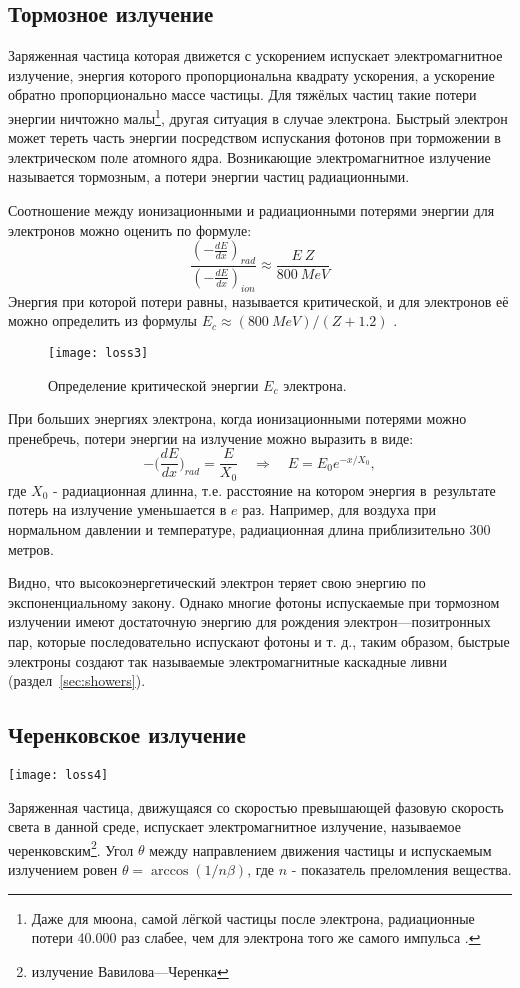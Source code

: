 \subsection{Тормозное излучение}
\label{sec:breaking}
Заряженная частица которая движется с ускорением испускает
электромагнитное излучение, энергия которого пропорциональна квадрату
ускорения, а ускорение обратно пропорционально массе частицы. Для
тяжёлых частиц такие потери энергии ничтожно малы\footnote{Даже для
мюона, самой лёгкой частицы после электрона, радиационные потери 40.000
раз слабее, чем для электрона того же самого импульса \cite{kor:06}.},
другая ситуация в случае электрона. Быстрый электрон может тереть часть
энергии посредством испускания фотонов при торможении в электрическом
поле атомного ядра. Возникающие электромагнитное излучение называется
тормозным, а потери энергии частиц радиационными.

Соотношение между ионизационными и радиационными потерями энергии для
электронов можно оценить по формуле:
\[
\frac{(-\frac{dE}{dx})_{rad}}{(-\frac{dE}{dx})_{ion}} \approx \frac{E~Z}{800~MeV}
\]
Энергия при которой потери равны, называется критической, и для электронов
её можно определить из формулы $E_c \approx (800~MeV)/(Z+1.2)$ \cite{sta}.
\begin{figure}[h]\center
  \texttt{[image: loss3]}
  \caption{Определение критической энергии $E_c$ электрона.}
  \label{fig:loss3}
\end{figure}

При больших энергиях электрона, когда ионизационными потерями можно
пренебречь, потери энергии на излучение можно выразить в виде:
\[
-\Bigg(\frac{dE}{dx}\Bigg)_{rad}=\frac{E}{X_0} \quad \Rightarrow \quad
E = E_0e^{-x/X_0},
\]
где $X_0$ - радиационная длинна, т.е. расстояние на котором энергия
в~результате потерь на излучение уменьшается в $e$ раз. Например, для
воздуха при нормальном давлении и температуре, радиационная длина
приблизительно 300 метров.

Видно, что высокоэнергетический электрон теряет свою энергию по
экспоненциальному закону. Однако многие фотоны испускаемые при
тормозном излучении имеют достаточную энергию для рождения
элек\-трон---позитронных пар, которые последовательно испускают фотоны
и т. д., таким образом, быстрые электроны создают так называемые
электромагнитные каскадные ливни (раздел~\ref{sec:showers}).

\subsection{Черенковское излучение}
\begin{floatingfigure}[l]{6.5cm}
  \texttt{[image: loss4]}
\end{floatingfigure}
Заряженная частица, движущаяся со скоростью превышающей фазовую
скорость света в данной среде, испускает электромагнитное излучение,
называемое черенковским\footnote{излучение Вавилова---Черенка}.
Угол $\theta$ между направлением движения частицы и испускаемым
излучением ровен $\theta =\arccos(1/n\beta)$, где $n$ - показатель
преломления вещества.

